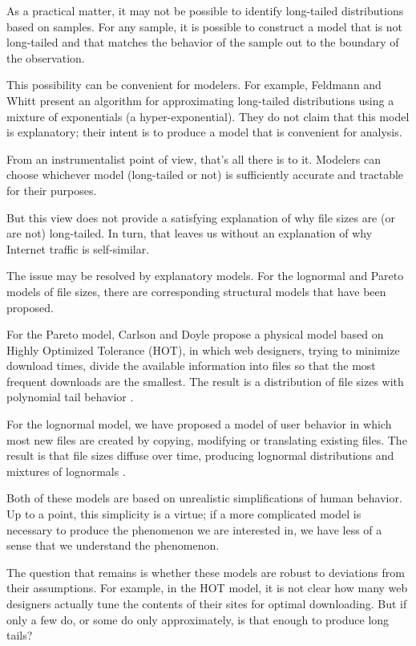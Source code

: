 \documentclass[twocolumn,11pt]{infocom}
\begin{document}
As a practical matter, it may not be possible to identify long-tailed
distributions based on samples.  For any sample, it is possible to
construct a model that is not long-tailed and that matches the
behavior of the sample out to the boundary of the observation.

This possibility can be convenient for modelers.  For example,
Feldmann and Whitt \cite{FeldmannWhitt97} present an algorithm for
approximating long-tailed distributions using a mixture of
exponentials (a hyper-exponential).  They do not claim that this model
is explanatory; their intent is to produce a model that is convenient
for analysis.

From an instrumentalist point of view, that's all there is to it.
Modelers can choose whichever model (long-tailed or not) is
sufficiently accurate and tractable for their purposes.

But this view does not provide a satisfying explanation of why
file sizes are (or are not) long-tailed.  In turn, that leaves us
without an explanation of why Internet traffic is self-similar.

The issue may be resolved by explanatory models.  For the lognormal
and Pareto models of file sizes, there are corresponding structural
models that have been proposed.

For the Pareto model, Carlson and Doyle propose a physical model based
on Highly Optimized Tolerance (HOT), in which web designers, trying to
minimize download times, divide the available information into files
so that the most frequent downloads are the smallest.  The result is 
a distribution of file sizes with polynomial tail behavior
\cite{CarlsonDoyle99} \cite{ZhuYuDoyle01}.

For the lognormal model, we have proposed a model of user behavior in
which most new files are created by copying, modifying or translating
existing files.  The result is that file sizes diffuse over time,
producing lognormal distributions and mixtures of lognormals
\cite{Downey01}.

Both of these models are based on unrealistic simplifications of human
behavior.  Up to a point, this simplicity is a virtue; if a more
complicated model is necessary to produce the phenomenon we are
interested in, we have less of a sense that we understand the
phenomenon.

The question that remains is whether these models are robust to
deviations from their assumptions.  For example, in the HOT model, it
is not clear how many web designers actually tune the contents of
their sites for optimal downloading.  But if only a few do,
or some do only approximately, is that enough to produce long
tails?
\end{document}
